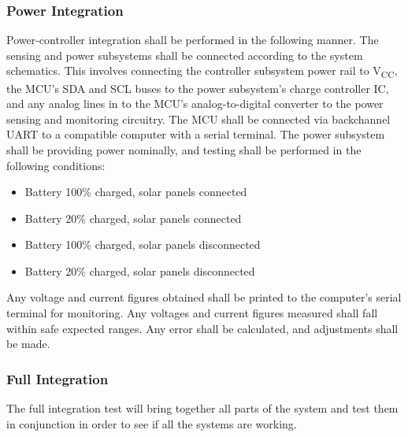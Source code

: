 \subsubsection{Power Integration}
Power-controller integration shall be performed in the following manner. The sensing and power subsystems shall be connected according to the system schematics. This involves connecting the controller subsystem power rail to V\textsubscript{CC}, the MCU's SDA and SCL buses to the power subsystem's charge controller IC, and any analog lines in to the MCU's analog-to-digital converter to the power sensing and monitoring circuitry. The MCU shall be connected via backchannel UART to a compatible computer with a serial terminal. The power subsystem shall be providing power nominally, and testing shall be performed in the following conditions:
\begin{itemize}
    \item Battery 100\% charged, solar panels connected
    \item Battery 20\% charged, solar panels connected
    \item Battery 100\% charged, solar panels disconnected
    \item Battery 20\% charged, solar panels disconnected
\end{itemize}
Any voltage and current figures obtained shall be printed to the computer's serial terminal for monitoring. Any voltages and current figures measured shall fall within safe expected ranges. Any error shall be calculated, and adjustments shall be made.

\subsubsection{Full Integration}
The full integration test will bring together all parts of the system and test them in conjunction in order to see if all the systems are working. 